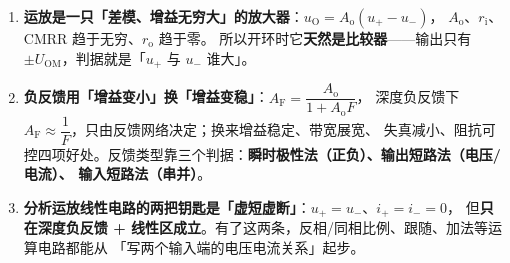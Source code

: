\documentclass[11pt]{ctexart}
\begin{document}
\begin{enumerate}

\item \textbf{运放是一只「差模、增益无穷大」的放大器}：$u_{\mathrm{O}}=A_{\mathrm{o}}(u_+-u_-)$，
$A_{\mathrm{o}}$、$r_{\mathrm{i}}$、CMRR 趋于无穷、$r_{\mathrm{o}}$ 趋于零。
所以开环时它\textbf{天然是比较器}——输出只有 $\pm U_{\mathrm{OM}}$，判据就是「$u_+$ 与 $u_-$ 谁大」。

\item \textbf{负反馈用「增益变小」换「增益变稳」}：$A_{\mathrm{F}}=\dfrac{A_{\mathrm{o}}}{1+A_{\mathrm{o}}F}$，
深度负反馈下 $A_{\mathrm{F}}\approx\dfrac{1}{F}$，只由反馈网络决定；换来增益稳定、带宽展宽、
失真减小、阻抗可控四项好处。反馈类型靠三个判据：\textbf{瞬时极性法（正负）、输出短路法（电压/电流）、
输入短路法（串并）}。

\item \textbf{分析运放线性电路的两把钥匙是「虚短虚断」}：$u_+=u_-$、$i_+=i_-=0$，
但\textbf{只在深度负反馈 + 线性区成立}。有了这两条，反相/同相比例、跟随、加法等运算电路都能从
「写两个输入端的电压电流关系」起步。

\end{enumerate}

\end{document}
